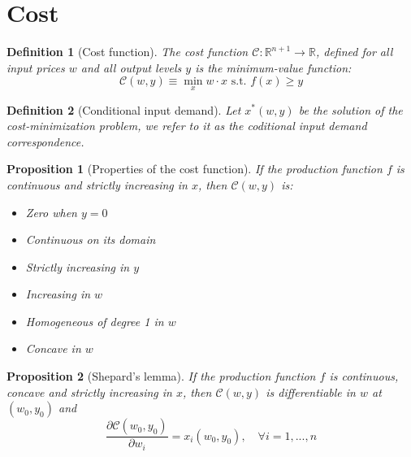 \documentclass[12pt]{report}
\newtheorem{definition}{Definition}[chapter]
\newtheorem{proposition}{Proposition}[chapter]
\begin{document}

\section{Cost}

\begin{definition}[Cost function]
The cost function $\mathcal{C}:\mathbb{R}^{n+1}\to \mathbb{R}$, defined for all input prices $w$ and all output levels $y$ is the minimum-value function: $$\mathcal{C}(w,y)\equiv \min_{x} w\cdot x\text{ s.t. } f(x)\geq y $$ 
\end{definition}

\begin{definition}[Conditional input demand]
Let $x^*(w,y)$ be the solution of the cost-minimization problem, we refer to it as the coditional input demand correspondence.
\end{definition}

\begin{proposition}[Properties of the cost function]
If the production function $f$ is continuous and strictly increasing in $x$, then $\mathcal{C}(w,y)$ is:\begin{itemize}
\item Zero when $y = 0$
\item Continuous on its domain
\item Strictly increasing in $y$
\item Increasing in $w$
\item Homogeneous of degree 1 in $w$
\item Concave in $w$
\end{itemize}
\end{proposition}

\begin{proposition}[Shepard's lemma]
If the production function $f$ is continuous, concave  and strictly increasing in $x$, then $\mathcal{C}(w,y)$ is differentiable in $w$ at $(w_0,y_0)$ and $$\frac{\partial \mathcal{C}(w_0,y_0)}{\partial w_i} = x_i(w_0,y_0), \quad \forall i = 1,..., n $$
\end{proposition}
\end{document}
